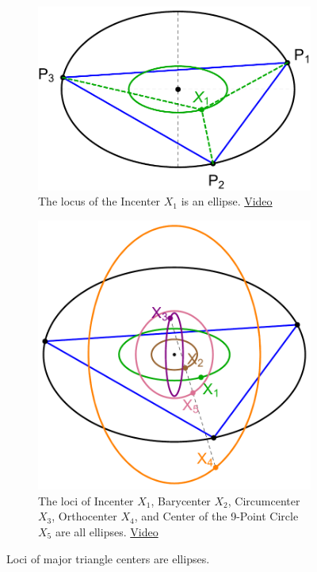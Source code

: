 \begin{figure}[H]
     \centering
     \begin{subfigure}[m]{0.45\textwidth}
     \centering
     \includegraphics[height=.65\linewidth]{pics/u0020_incenter_locus.pdf}
         \caption{The locus of the Incenter $X_1$ is an ellipse. \href{https://www.youtube.com/watch?v=BBsyM7RnswA}{Video} \cite[pl\#2]{dsr_math_intell_playlist}}
        \label{fig:locus-incenter}
     \end{subfigure}
     \hfill
     \begin{subfigure}[m]{0.45\textwidth}
         \centering
         \includegraphics[height=\linewidth]{pics/u0030_x12345_locus.pdf}
         \caption{The loci of Incenter $X_1$, Barycenter $X_2$, Circumcenter $X_3$, Orthocenter $X_4$, and Center of the 9-Point Circle $X_5$ are all ellipses. \href{https://youtu.be/sMcNzcYaqtg}{Video} \cite[pl\#7]{dsr_math_intell_playlist}}
         \label{fig:locus-x12345}
     \end{subfigure}
     \caption{Loci of major triangle centers are ellipses.}
     \label{fig:7}
\end{figure}
%
